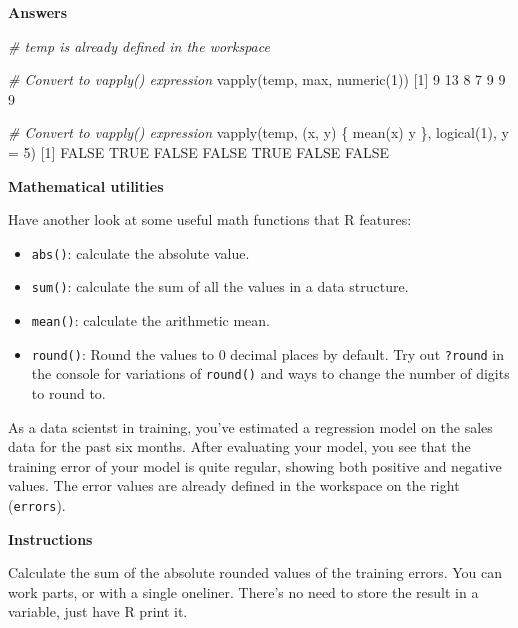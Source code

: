 \documentclass[]{article}
\providecommand{\tightlist}{%
  \setlength{\itemsep}{0pt}\setlength{\parskip}{0pt}}
\newcommand{\hlnum}[1]{\textcolor[rgb]{0.816,0.125,0.439}{#1}}%
\newcommand{\hlstr}[1]{\textcolor[rgb]{0.251,0.627,0.251}{#1}}%
\newcommand{\hlcom}[1]{\textcolor[rgb]{0.502,0.502,0.502}{\textit{#1}}}%
\newcommand{\hlstd}[1]{\textcolor[rgb]{0.251,0.251,0.251}{#1}}%
\newcommand{\hlkwc}[1]{\textcolor[rgb]{0.251,0.251,0.251}{#1}}%
\newcommand{\hlkwd}[1]{\textcolor[rgb]{0.878,0.439,0.125}{#1}}%
\newenvironment{Shaded}{\begin{myshaded}}{\end{myshaded}}
\newcommand{\KeywordTok}[1]{\hlkwd{#1}}
\newcommand{\DataTypeTok}[1]{\hlkwc{#1}}
\newcommand{\DecValTok}[1]{\hlnum{#1}}
\newcommand{\StringTok}[1]{\hlstr{#1}}
\newcommand{\CommentTok}[1]{\hlcom{#1}}
\newcommand{\OtherTok}[1]{{#1}}
\newcommand{\NormalTok}[1]{\hlstd{#1}}
\begin{document}
\textbf{Answers}

\begin{Shaded}
\begin{Highlighting}[]
\CommentTok{# temp is already defined in the workspace}

\CommentTok{# Convert to vapply() expression}
\KeywordTok{vapply}\NormalTok{(temp, max, }\KeywordTok{numeric}\NormalTok{(}\DecValTok{1}\NormalTok{))}
\NormalTok{   [}\DecValTok{1}\NormalTok{]  }\DecValTok{9} \DecValTok{13}  \DecValTok{8}  \DecValTok{7}  \DecValTok{9}  \DecValTok{9}  \DecValTok{9}

\CommentTok{# Convert to vapply() expression}
\KeywordTok{vapply}\NormalTok{(temp, }\NormalTok{(x, y) \{ }\KeywordTok{mean}\NormalTok{(x) }\OperatorTok{>}\StringTok{ }\NormalTok{y \}, }\KeywordTok{logical}\NormalTok{(}\DecValTok{1}\NormalTok{), }\DataTypeTok{y =} \DecValTok{5}\NormalTok{)}
\NormalTok{   [}\DecValTok{1}\NormalTok{] }\OtherTok{FALSE}  \OtherTok{TRUE} \OtherTok{FALSE} \OtherTok{FALSE}  \OtherTok{TRUE} \OtherTok{FALSE} \OtherTok{FALSE}
\end{Highlighting}
\end{Shaded}

\textbf{Mathematical utilities}

Have another look at some useful math functions that R features:

\begin{itemize}
\tightlist
\item
  \texttt{abs()}: calculate the absolute value.
\item
  \texttt{sum()}: calculate the sum of all the values in a data
  structure.
\item
  \texttt{mean()}: calculate the arithmetic mean.
\item
  \texttt{round()}: Round the values to 0 decimal places by default. Try
  out \texttt{?round} in the console for variations of \texttt{round()}
  and ways to change the number of digits to round to.
\end{itemize}

As a data scientst in training, you've estimated a regression model on
the sales data for the past six months. After evaluating your model, you
see that the training error of your model is quite regular, showing both
positive and negative values. The error values are already defined in
the workspace on the right (\texttt{errors}).

\textbf{Instructions}

\begin{Shaded}
\begin{Highlighting}[]
\NormalTok{Calculate the sum of the absolute rounded values of the training errors. You can work }\NormalTok{ parts, or with a single one}\OperatorTok{-}\NormalTok{liner. There}\StringTok{'s no need to store the result in a variable, just have R print it.}
\end{Highlighting}
\end{Shaded}
\end{document}
